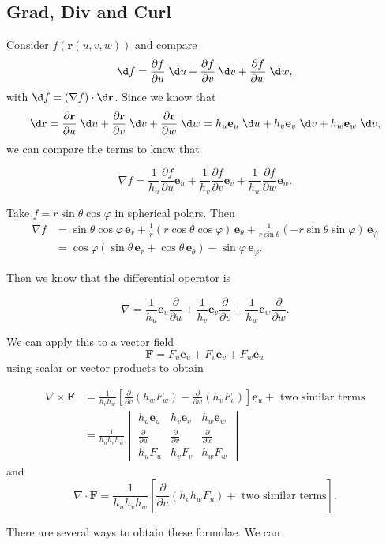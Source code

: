 \documentclass[a4paper]{article}
\begin{document}
\subsection{Grad, Div and Curl}
Consider $f(\mathbf{r}(u, v, w))$ and compare
\[
  \d f = \frac{\partial f}{\partial u}\;\d u + \frac{\partial f}{\partial v}\;\d v + \frac{\partial f}{\partial w}\;\d w,
\]
with $\d f = (\nabla f)\cdot \d \mathbf{r}$. Since we know that
\[
  \d \mathbf{r} = \frac{\partial \mathbf{r}}{\partial u}\;\d u + \frac{\partial \mathbf{r}}{\partial v}\;\d v + \frac{\partial \mathbf{r}}{\partial w}\;\d w = h_u \mathbf{e}_u \;\d u + h_v \mathbf{e}_v \;\d v + h_w \mathbf{e}_w \;\d v,
\]
we can compare the terms to know that
\begin{prop}
  \[
    \nabla f = \frac{1}{h_u} \frac{\partial f}{\partial u} \mathbf{e}_u + \frac{1}{h_v} \frac{\partial f}{\partial v}\mathbf{e}_v + \frac{1}{h_w} \frac{\partial f}{\partial w}\mathbf{e}_w.
  \]
\end{prop}
\begin{eg}
  Take $f = r\sin \theta\cos \varphi$ in spherical polars. Then
  \begin{align*}
    \nabla f &= \sin \theta\cos \varphi\,\mathbf{e}_r + \frac{1}{r}(r\cos \theta\cos \varphi)\,\mathbf{e}_\theta + \frac{1}{r\sin \theta}(-r\sin \theta\sin \varphi)\,\mathbf{e}_\varphi\\
    &= \cos\varphi(\sin \theta \,\mathbf{e}_r + \cos \theta \,\mathbf{e}_\theta) - \sin \varphi \,\mathbf{e}_\varphi.
  \end{align*}
\end{eg}

Then we know that the differential operator is
\begin{prop}
  \[
    \nabla = \frac{1}{h_u}\mathbf{e}_u \frac{\partial }{\partial u} + \frac{1}{h_v}\mathbf{e}_v\frac{\partial }{\partial v} + \frac{1}{h_w}\mathbf{e}_w \frac{\partial}{\partial w}.
  \]
\end{prop}
We can apply this to a vector field
\[
  \mathbf{F} = F_u \mathbf{e}_u + F_v \mathbf{e}_v + F_w \mathbf{e}_w
\]
using scalar or vector products to obtain
\begin{prop}
  \begin{align*}
    \nabla \times \mathbf{F} &= \frac{1}{h_vh_w}\left[\frac{\partial}{\partial v}(h_wF_w) - \frac{\partial }{\partial w}(h_vF_v)\right]\mathbf{e}_u + \text{ two similar terms}\\
    &= \frac{1}{h_uh_vh_w}
    \begin{vmatrix} h_u\mathbf{e}_u & h_v\mathbf{e}_v & h_w \mathbf{e}_w\\
      \frac{\partial}{\partial u} & \frac{\partial}{\partial v} & \frac{\partial}{\partial w}\\
      h_u F_u & h_v F_v & h_wF_w
    \end{vmatrix}
  \end{align*}
  and
  \[
    \nabla\cdot \mathbf{F} = \frac{1}{h_uh_vh_w}\left[\frac{\partial}{\partial u}(h_vh_wF_u) + \text{ two similar terms}\right].
  \]
\end{prop}
There are several ways to obtain these formulae. We can
\end{document}
